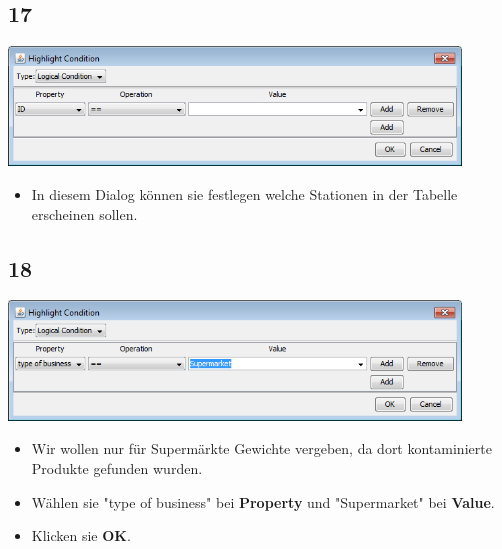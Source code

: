 \documentclass{beamer}
\begin{document}
\subsection{17}
\begin{frame}
	\begin{center}
  		\includegraphics[width=0.9\textwidth]{17.png}
	\end{center}
	\begin{itemize}
		\item In diesem Dialog können sie festlegen welche Stationen in der Tabelle erscheinen sollen.
	\end{itemize}
\end{frame}

\subsection{18}
\begin{frame}
	\begin{center}
  		\includegraphics[width=0.9\textwidth]{18.png}
	\end{center}
	\begin{itemize}
		\item Wir wollen nur für Supermärkte Gewichte vergeben, da dort kontaminierte Produkte gefunden wurden.
		\item Wählen sie "type of business" bei \textbf{Property} und "Supermarket" bei \textbf{Value}.
		\item Klicken sie \textbf{OK}.
	\end{itemize}
\end{frame}
\end{document}
